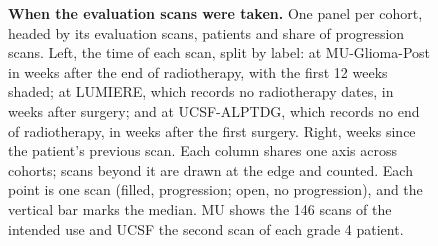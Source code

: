 \begin{figure}[!htbp]
\centering
{}
\caption{\textbf{When the evaluation scans were taken.} One panel per cohort, headed by its evaluation scans,
patients and share of progression scans. Left, the time of each scan, split by label: at MU-Glioma-Post in weeks
after the end of radiotherapy, with the first 12 weeks shaded; at LUMIERE, which records no radiotherapy dates, in
weeks after surgery; and at UCSF-ALPTDG, which records no end of radiotherapy, in weeks after the first surgery.
Right, weeks since the patient's previous scan. Each column shares one axis across cohorts; scans beyond it are drawn
at the edge and counted. Each point is one scan (filled, progression; open, no progression), and the vertical bar
marks the median. MU shows the 146 scans of the intended use and UCSF the second scan of each grade 4 patient.}
\label{fig:cohorts}
\end{figure}

